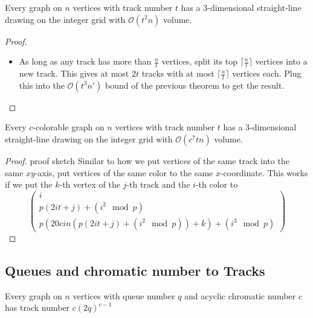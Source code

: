 \documentclass[t]{beamer}
\begin{document}
\begin{frame}
    \begin{theorem}
	Every graph on $n$ vertices with track number $t$ has a 3-dimensional straight-line drawing on the integer grid with $\mathcal O(t^2n)$ volume.
    \end{theorem}
    \pause
    \begin{proof}
	\begin{itemize}
	    \item As long as any track has more than $\frac{n}{t}$ vertices, split its top $\lceil\frac{n}{t}\rceil$ vertices into a new track. \pause This gives at most $2t$ tracks with at most $\lceil\frac{n}{t}\rceil$ vertices each. \pause Plug this into the $\mathcal O(t^3n')$ bound of the previous theorem to get the result.
	\end{itemize}
    \end{proof}
\end{frame}

\begin{frame}
    \begin{theorem}
	Every $c$-colorable graph on $n$ vertices with track number $t$ has a 3-dimensional straight-line drawing on the integer grid with $\mathcal O(c^7tn)$ volume.
    \end{theorem}
    \begin{proof}{proof sketch}
	Similar to how we put vertices of the same track into the same $xy$-axis, put vertices of the same color to the same $x$-coordinate. This works if we put the $k$-th vertex of the $j$-th track and the $i$-th color to \[
	    \begin{pmatrix}
		i\\ p(2it+j)+(i^2 \mod p)\\ p(20cin (p(2it+j)+(i^2 \mod p))+k)+(i^3 \mod p)
	    \end{pmatrix}
	\]
    \end{proof}
\end{frame}

\subsection{Queues and chromatic number to Tracks}

\begin{frame}
    \begin{theorem}
	Every graph on $n$ vertices with queue number $q$ and acyclic chromatic number $c$ has track number $c(2q)^{c-1}$
    \end{theorem}
\end{frame}
\end{document}
